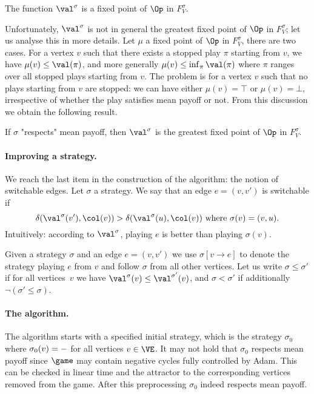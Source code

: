 \begin{fact}
The function $\val^\sigma$ is a fixed point of $\Op$ in $F^\sigma_V$.
\end{fact}
Unfortunately, $\val^{\sigma}$ is not in general the greatest fixed point of $\Op$ in $F^\sigma_V$;
let us analyse this in more details.
Let $\mu$ a fixed point of $\Op$ in $F^\sigma_V$, there are two cases. 
For a vertex $v$ such that there exists a stopped play $\pi$ starting from $v$, we have $\mu(v) \le \val(\pi)$, and more generally
$\mu(v) \le \inf_{\pi} \val(\pi)$ where $\pi$ ranges over all stopped plays starting from $v$.
The problem is for a vertex $v$ such that no plays starting from $v$ are stopped: 
we can have either $\mu(v) = \top$ or $\mu(v) = \bot$, irrespective of whether the play satisfies mean payoff or not.
From this discussion we obtain the following result.

\begin{lemma}
\label{4-lem:greatest_fixed_point}
If $\sigma$ "respects" mean payoff, then $\val^{\sigma}$ is the greatest fixed point of $\Op$ in $F^\sigma_V$.
\end{lemma}

\paragraph{\bf Improving a strategy.}
We reach the last item in the construction of the algorithm: the notion of switchable edges.
Let $\sigma$ a strategy. We say that an edge $e = (v,v')$ is switchable if 
\[
\delta(\val^{\sigma}(v'),\col(v)) > \delta(\val^{\sigma}(u),\col(v)) \text{ where } \sigma(v) = (v,u).
\]
Intuitively: according to $\val^{\sigma}$, playing $e$ is better than playing $\sigma(v)$.

Given a strategy $\sigma$ and an edge $e = (v,v')$ we use $\sigma[v \to e]$ to denote the strategy playing $e$ from $v$ 
and follow $\sigma$ from all other vertices.
Let us write $\sigma \le \sigma'$ if for all vertices~$v$ we have $\val^{\sigma}(v) \le \val^{\sigma'}(v)$,
and $\sigma < \sigma'$ if additionally $\neg (\sigma' \le \sigma)$.

\paragraph{\bf The algorithm.}
The algorithm starts with a specified initial strategy, which is the strategy
$\sigma_0$ where $\sigma_0(v) = \mathtt{-}$ for all vertices $v \in \VE$. 
It may not hold that $\sigma_0$ respects mean payoff since $\game$ may contain negative cycles fully controlled by Adam.
This can be checked in linear time and the attractor to the corresponding vertices removed from the game.
After this preprocessing $\sigma_0$ indeed respects mean payoff.

